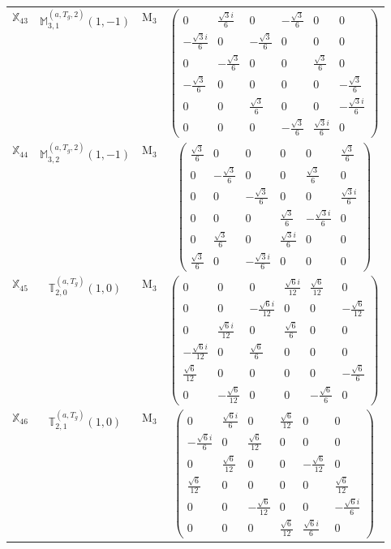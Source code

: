 \documentclass[fleqn,10pt,landscape]{article}
\begin{document}
\begin{itemize}
\begin{center}
\begin{longtable}{c|c|c|c}
$ \mathbb{X}_{43} $ & $\mathbb{M}_{3,1}^{(a,T_{g},2)}(1,-1)$ & M$_{3}$ & $\begin{pmatrix} 0 & \frac{\sqrt{3} i}{6} & 0 & - \frac{\sqrt{3}}{6} & 0 & 0 \\ - \frac{\sqrt{3} i}{6} & 0 & - \frac{\sqrt{3}}{6} & 0 & 0 & 0 \\ 0 & - \frac{\sqrt{3}}{6} & 0 & 0 & \frac{\sqrt{3}}{6} & 0 \\ - \frac{\sqrt{3}}{6} & 0 & 0 & 0 & 0 & - \frac{\sqrt{3}}{6} \\ 0 & 0 & \frac{\sqrt{3}}{6} & 0 & 0 & - \frac{\sqrt{3} i}{6} \\ 0 & 0 & 0 & - \frac{\sqrt{3}}{6} & \frac{\sqrt{3} i}{6} & 0 \end{pmatrix}$ \\
$ \mathbb{X}_{44} $ & $\mathbb{M}_{3,2}^{(a,T_{g},2)}(1,-1)$ & M$_{3}$ & $\begin{pmatrix} \frac{\sqrt{3}}{6} & 0 & 0 & 0 & 0 & \frac{\sqrt{3}}{6} \\ 0 & - \frac{\sqrt{3}}{6} & 0 & 0 & \frac{\sqrt{3}}{6} & 0 \\ 0 & 0 & - \frac{\sqrt{3}}{6} & 0 & 0 & \frac{\sqrt{3} i}{6} \\ 0 & 0 & 0 & \frac{\sqrt{3}}{6} & - \frac{\sqrt{3} i}{6} & 0 \\ 0 & \frac{\sqrt{3}}{6} & 0 & \frac{\sqrt{3} i}{6} & 0 & 0 \\ \frac{\sqrt{3}}{6} & 0 & - \frac{\sqrt{3} i}{6} & 0 & 0 & 0 \end{pmatrix}$ \\
$ \mathbb{X}_{45} $ & $\mathbb{T}_{2,0}^{(a,T_{g})}(1,0)$ & M$_{3}$ & $\begin{pmatrix} 0 & 0 & 0 & \frac{\sqrt{6} i}{12} & \frac{\sqrt{6}}{12} & 0 \\ 0 & 0 & - \frac{\sqrt{6} i}{12} & 0 & 0 & - \frac{\sqrt{6}}{12} \\ 0 & \frac{\sqrt{6} i}{12} & 0 & \frac{\sqrt{6}}{6} & 0 & 0 \\ - \frac{\sqrt{6} i}{12} & 0 & \frac{\sqrt{6}}{6} & 0 & 0 & 0 \\ \frac{\sqrt{6}}{12} & 0 & 0 & 0 & 0 & - \frac{\sqrt{6}}{6} \\ 0 & - \frac{\sqrt{6}}{12} & 0 & 0 & - \frac{\sqrt{6}}{6} & 0 \end{pmatrix}$ \\
$ \mathbb{X}_{46} $ & $\mathbb{T}_{2,1}^{(a,T_{g})}(1,0)$ & M$_{3}$ & $\begin{pmatrix} 0 & \frac{\sqrt{6} i}{6} & 0 & \frac{\sqrt{6}}{12} & 0 & 0 \\ - \frac{\sqrt{6} i}{6} & 0 & \frac{\sqrt{6}}{12} & 0 & 0 & 0 \\ 0 & \frac{\sqrt{6}}{12} & 0 & 0 & - \frac{\sqrt{6}}{12} & 0 \\ \frac{\sqrt{6}}{12} & 0 & 0 & 0 & 0 & \frac{\sqrt{6}}{12} \\ 0 & 0 & - \frac{\sqrt{6}}{12} & 0 & 0 & - \frac{\sqrt{6} i}{6} \\ 0 & 0 & 0 & \frac{\sqrt{6}}{12} & \frac{\sqrt{6} i}{6} & 0 \end{pmatrix}$ \\

\end{longtable}
\end{center}
\end{itemize}
\end{document}
